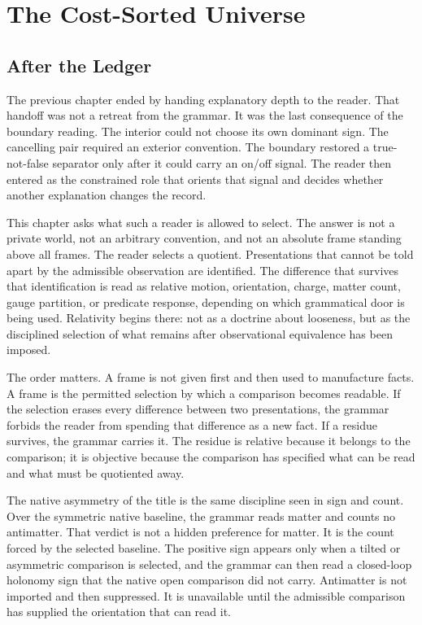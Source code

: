 \chapter{The Cost-Sorted Universe}
\label{chap:relativity-selection-native-asymmetry}

\section{After the Ledger}

The previous chapter ended by handing explanatory depth to the reader. That
handoff was not a retreat from the grammar. It was the last consequence of
the boundary reading. The interior could not choose its own dominant sign.
The cancelling pair required an exterior convention. The boundary restored a
true-not-false separator only after it could carry an on/off signal. The
reader then entered as the constrained role that orients that signal and
decides whether another explanation changes the record.

This chapter asks what such a reader is allowed to select. The answer is not
a private world, not an arbitrary convention, and not an absolute frame
standing above all frames. The reader selects a quotient. Presentations that
cannot be told apart by the admissible observation are identified. The
difference that survives that identification is read as relative motion,
orientation, charge, matter count, gauge partition, or predicate response,
depending on which grammatical door is being used. Relativity begins there:
not as a doctrine about looseness, but as the disciplined selection of what
remains after observational equivalence has been imposed.

The order matters. A frame is not given first and then used to manufacture
facts. A frame is the permitted selection by which a comparison becomes
readable. If the selection erases every difference between two
presentations, the grammar forbids the reader from spending that difference
as a new fact. If a residue survives, the grammar carries it. The residue is
relative because it belongs to the comparison; it is objective because the
comparison has specified what can be read and what must be quotiented away.

The native asymmetry of the title is the same discipline seen in sign and
count. Over the symmetric native baseline, the grammar reads matter and
counts no antimatter. That verdict is not a hidden preference for matter. It
is the count forced by the selected baseline. The positive sign appears only
when a tilted or asymmetric comparison is selected, and the grammar can then
read a closed-loop holonomy sign that the native open comparison did not
carry. Antimatter is not imported and then suppressed. It is unavailable
until the admissible comparison has supplied the orientation that can read
it.

